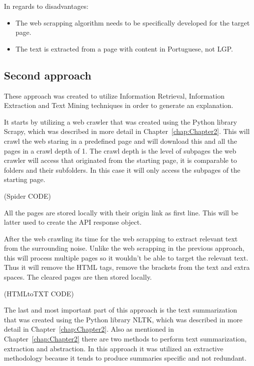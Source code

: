 In regards to disadvantages:
\begin{itemize}
        \item The web scrapping algorithm needs to be specifically developed for the target page.
        \item The text is extracted from a page with content in Portuguese, not \gls{LGP}.
\end{itemize}

\subsection{Second approach}

These approach was created to utilize Information Retrieval, Information Extraction and Text Mining techniques in order to generate an explanation.

It starts by utilizing a web crawler that was created using the Python library Scrapy, which was described in more detail in Chapter~\ref{chap:Chapter2}.
This will crawl the web staring in a predefined page and will download this and all the pages in a crawl depth of 1.
The crawl depth is the level of subpages the web crawler will access that originated from the starting page, it is comparable to folders and their subfolders.
In this case it will only access the subpages of the starting page.

(Spider CODE) %

All the pages are stored locally with their origin link as first line.
This will be latter used to create the API response object.

After the web crawling its time for the web scrapping to extract relevant text from the surrounding noise.
Unlike the web scrapping in the previous approach, this will process multiple pages so it wouldn't be able to target the relevant text.
Thus it will remove the HTML tags, remove the brackets from the text and extra spaces.
The cleared pages are then stored locally.

(HTMLtoTXT CODE) %

The last and most important part of this approach is the text summarization that was created using the Python library NLTK, which was described in more detail in Chapter~\ref{chap:Chapter2}.
Also as mentioned in Chapter~\ref{chap:Chapter2} there are two methods to perform text summarization, extraction and abstraction.
In this approach it was utilized an extractive methodology because it tends to produce summaries specific and not redundant\cite{cheung2008comparing}.


